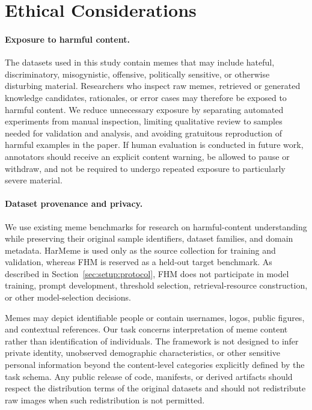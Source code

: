 \section{Ethical Considerations}
\label{sec:ethics}

\paragraph{Exposure to harmful content.}
The datasets used in this study contain memes that may include hateful,
discriminatory, misogynistic, offensive, politically sensitive, or otherwise
disturbing material.
Researchers who inspect raw memes, retrieved or generated knowledge
candidates, rationales, or error cases may therefore be exposed to harmful
content.
We reduce unnecessary exposure by separating automated experiments from
manual inspection, limiting qualitative review to samples needed for
validation and analysis, and avoiding gratuitous reproduction of harmful
examples in the paper.
If human evaluation is conducted in future work, annotators should receive
an explicit content warning, be allowed to pause or withdraw, and not be
required to undergo repeated exposure to particularly severe material.

\paragraph{Dataset provenance and privacy.}
We use existing meme benchmarks for research on harmful-content
understanding while preserving their original sample identifiers, dataset
families, and domain metadata.
HarMeme is used only as the source collection for training and validation,
whereas FHM is reserved as a held-out target benchmark.
As described in Section~\ref{sec:setup:protocol}, FHM does not participate
in model training, prompt development, threshold selection,
retrieval-resource construction, or other model-selection decisions.

Memes may depict identifiable people or contain usernames, logos, public
figures, and contextual references.
Our task concerns interpretation of meme content rather than identification
of individuals.
The framework is not designed to infer private identity, unobserved
demographic characteristics, or other sensitive personal information
beyond the content-level categories explicitly defined by the task schema.
Any public release of code, manifests, or derived artifacts should respect
the distribution terms of the original datasets and should not redistribute
raw images when such redistribution is not permitted.

